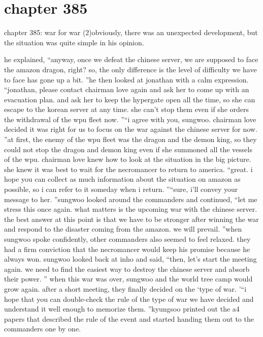 \section{chapter 385}

chapter 385: war for war (2)obviously, there was an unexpected development, but the situation was quite simple in his opinion.





he explained, “anyway, once we defeat the chinese server, we are supposed to face the amazon dragon, right? so, the only difference is the level of difficulty we have to face has gone up a bit.
”he then looked at jonathan with a calm expression.
“jonathan, please contact chairman love again and ask her to come up with an evacuation plan.
 and ask her to keep the hypergate open all the time, so she can escape to the korean server at any time.
 she can’t stop them even if she orders the withdrawal of the wpu fleet now.
”“i agree with you, sungwoo.
 chairman love decided it was right for us to focus on the war against the chinese server for now.
”at first, the enemy of the wpu fleet was the dragon and the demon king, so they could not stop the dragon and demon king even if she summoned all the vessels of the wpu.
chairman love knew how to look at the situation in the big picture.
 she knew it was best to wait for the necromancer to return to america.
“great.
 i hope you can collect as much information about the situation on amazon as possible, so i can refer to it someday when i return.
”“sure, i’ll convey your message to her.
”sungwoo looked around the commanders and continued, “let me stress this once again.
 what matters is the upcoming war with the chinese server.
 the best answer at this point is that we have to be stronger after winning the war and respond to the disaster coming from the amazon.
 we will prevail.
”when sungwoo spoke confidently, other commanders also seemed to feel relaxed.
they had a firm conviction that the necromancer would keep his promise because he always won.
sungwoo looked back at inho and said, “then, let’s start the meeting again.
 we need to find the easiest way to destroy the chinese server and absorb their power.
”
when this war was over, sungwoo and the world tree camp would grow again.
after a short meeting, they finally decided on the ‘type of war.
’“i hope that you can double-check the rule of the type of war we have decided and understand it well enough to memorize them.
”kyungsoo printed out the a4 papers that described the rule of the event and started handing them out to the commanders one by one.
